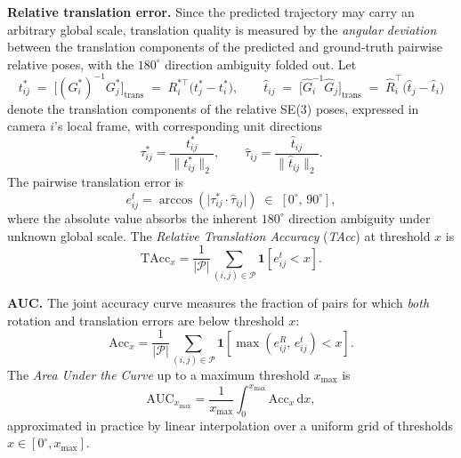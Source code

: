 \textbf{Relative translation error.}
Since the predicted trajectory may carry an arbitrary global scale, translation quality is measured by the \emph{angular deviation} between the translation components of the predicted and ground-truth pairwise relative poses, with the $180^{\circ}$ direction ambiguity folded out.
%
Let
\begin{equation}
  t_{ij}^{*}\;=\;\bigl[(G_i^{*})^{-1}G_j^{*}\bigr]_{\mathrm{trans}}\;=\;R_i^{*\top}\bigl(t_j^{*}-t_i^{*}\bigr),
  \qquad
  \hat{t}_{ij}\;=\;\bigl[\hat{G}_i^{-1}\hat{G}_j\bigr]_{\mathrm{trans}}\;=\;\hat{R}_i^{\top}\bigl(\hat{t}_j-\hat{t}_i\bigr)
\end{equation}
denote the translation components of the relative SE(3) poses, expressed in camera $i$'s local frame, with corresponding unit directions
\begin{equation}
  \tau_{ij}^{*} = \frac{t_{ij}^{*}}{\|t_{ij}^{*}\|_2},
  \qquad
  \hat{\tau}_{ij} = \frac{\hat{t}_{ij}}{\|\hat{t}_{ij}\|_2}.
\end{equation}
The pairwise translation error is
\begin{equation}
  e^{t}_{ij}
  = \arccos\!\left(\bigl|\tau_{ij}^{*}\cdot\hat{\tau}_{ij}\bigr|\right)
  \;\in\; [0^{\circ},\,90^{\circ}],
  \label{eq:rte}
\end{equation}
where the absolute value absorbs the inherent $180^{\circ}$ direction ambiguity under unknown global scale.
%
The \emph{Relative Translation Accuracy} (\textit{TAcc}) at threshold $x$ is
\begin{equation}
  \mathrm{TAcc}_{x}
  = \frac{1}{|\mathcal{P}|}\sum_{(i,j)\in\mathcal{P}}
    \mathbf{1}\!\left[e^{t}_{ij} < x\right].
  \label{eq:tacc}
\end{equation}

\textbf{AUC.}
The joint accuracy curve measures the fraction of pairs for which \emph{both} rotation and translation errors are below threshold $x$:
\begin{equation}
  \mathrm{Acc}_{x}
  = \frac{1}{|\mathcal{P}|}\sum_{(i,j)\in\mathcal{P}}
    \mathbf{1}\!\left[\max\!\left(e^{R}_{ij},\,e^{t}_{ij}\right) < x\right].
  \label{eq:acc_joint}
\end{equation}
The \emph{Area Under the Curve} up to a maximum threshold $x_{\max}$ is
\begin{equation}
  \mathrm{AUC}_{x_{\max}}
  = \frac{1}{x_{\max}}\int_{0}^{x_{\max}}\mathrm{Acc}_{x}\,\mathrm{d}x,
  \label{eq:auc}
\end{equation}
approximated in practice by linear interpolation over a uniform grid of thresholds $x\in[0^{\circ},x_{\max}]$.

